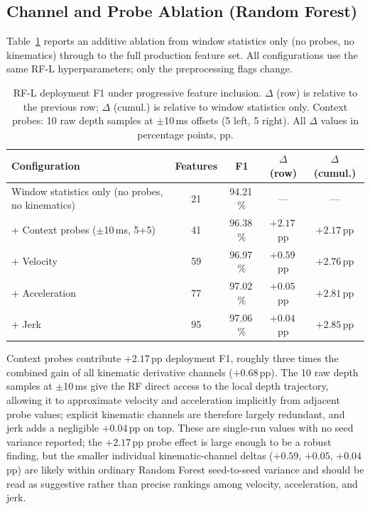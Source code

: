\subsection{Channel and Probe Ablation (Random Forest)}
\label{sec:eval-channel-ablation}

Table~\ref{tab:channel-ablation} reports an additive ablation from window statistics
only (no probes, no kinematics) through to the full production feature set.
All configurations use the same RF-L hyperparameters; only the preprocessing flags
change.

\begin{table}[t]
\centering
\small
\caption{RF-L deployment F1 under progressive feature inclusion. $\Delta$ (row) is
relative to the previous row; $\Delta$ (cumul.) is relative to window statistics
only. Context probes: 10 raw depth samples at $\pm$10\,ms offsets (5 left, 5 right).
All $\Delta$ values in percentage points, pp.}
\label{tab:channel-ablation}
\begin{tabular}{lcccc}
\toprule
\textbf{Configuration} & \textbf{Features} & \textbf{F1} & \textbf{$\Delta$ (row)} & \textbf{$\Delta$ (cumul.)} \\
\midrule
Window statistics only (no probes, no kinematics) & 21 & 94.21\,\% & --- & --- \\
+ Context probes ($\pm$10\,ms, 5+5)               & 41 & 96.38\,\% & $+2.17$\,pp & $+2.17$\,pp \\
+ Velocity                                         & 59 & 96.97\,\% & $+0.59$\,pp & $+2.76$\,pp \\
+ Acceleration                                     & 77 & 97.02\,\% & $+0.05$\,pp & $+2.81$\,pp \\
+ Jerk                                             & 95 & 97.06\,\% & $+0.04$\,pp & $+2.85$\,pp \\
\bottomrule
\end{tabular}
\end{table}

Context probes contribute $+2.17$\,pp deployment F1, roughly three times the combined
gain of all kinematic derivative channels ($+0.68$\,pp).  The 10 raw depth samples at
$\pm$10\,ms give the RF direct access to the local depth trajectory, allowing it to
approximate velocity and acceleration implicitly from adjacent probe values; explicit
kinematic channels are therefore largely redundant, and jerk adds a negligible
$+0.04$\,pp on top. These are single-run values with no seed variance reported; the
$+2.17$\,pp probe effect is large enough to be a robust finding, but the smaller
individual kinematic-channel deltas ($+0.59$, $+0.05$, $+0.04$\,pp) are likely within
ordinary Random Forest seed-to-seed variance and should be read as suggestive rather
than precise rankings among velocity, acceleration, and jerk.

